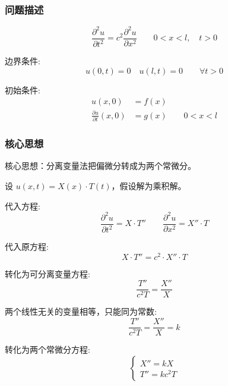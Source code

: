 \documentclass[12pt,a4paper]{article}
\numberwithin{subsection}{section}
\numberwithin{subsubsection}{subsection}
\theoremstyle{plain}
\theoremstyle{definition}
\theoremstyle{remark}
\begin{document}
	\subsubsection{问题描述}
	\begin{equation} \label{eq:wave_equation}
		\frac{\partial^2 u}{\partial t^2} = c^2 \frac{\partial^2 u}{\partial x^2} \qquad 0 < x < l, \quad t > 0
	\end{equation}
	
	边界条件:
	\begin{equation} \label{eq:boundary_conditions}
		u(0, t) = 0 \quad u(l, t) = 0 \qquad \forall t > 0
	\end{equation}
	
	初始条件:
	\begin{equation} \label{eq:initial_conditions}
		\begin{aligned}
			u(x, 0) &= f(x) \\
			\frac{\partial u}{\partial t}(x, 0) &= g(x) \qquad 0 < x < l
		\end{aligned}
	\end{equation}
	
	\subsubsection{核心思想}
	核心思想：分离变量法把偏微分转成为两个常微分。
	
	设 \(u(x, t) = X(x) \cdot T(t)\)，假设解为乘积解。
	
	代入方程:
	\begin{equation} \label{eq:substitution}
		\frac{\partial^2 u}{\partial t^2} = X \cdot T'' \qquad \frac{\partial^2 u}{\partial x^2} = X'' \cdot T
	\end{equation}
	
	代入原方程:
	\begin{equation} \label{eq:original_substitution}
		X \cdot T'' = c^2 \cdot X'' \cdot T
	\end{equation}
	
	转化为可分离变量方程:
	\begin{equation} \label{eq:separation}
		\frac{T''}{c^2 T} = \frac{X''}{X}
	\end{equation}
	
	两个线性无关的变量相等，只能同为常数:
	\begin{equation} \label{eq:constant}
		\frac{T''}{c^2 T} = \frac{X''}{X} = k
	\end{equation}
	
	转化为两个常微分方程:
	\begin{equation} \label{eq:ode}
		\begin{cases}
			X'' = kX \\
			T'' = k c^2 T
		\end{cases}
	\end{equation}
	
\end{document}
